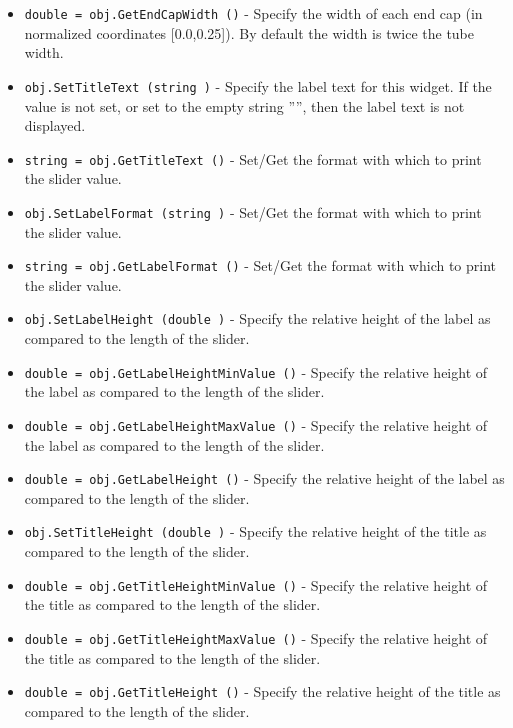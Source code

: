 \begin{itemize}
\item  \verb|double = obj.GetEndCapWidth ()| -  Specify the width of each end cap (in normalized coordinates
 [0.0,0.25]). By default the width is twice the tube width. 

\item  \verb|obj.SetTitleText (string )| -  Specify the label text for this widget. If the value is not set, or set
 to the empty string '''', then the label text is not displayed.

\item  \verb|string = obj.GetTitleText ()| -  Set/Get the format with which to print the slider value.

\item  \verb|obj.SetLabelFormat (string )| -  Set/Get the format with which to print the slider value.

\item  \verb|string = obj.GetLabelFormat ()| -  Set/Get the format with which to print the slider value.

\item  \verb|obj.SetLabelHeight (double )| -  Specify the relative height of the label as compared to the length of the
 slider. 

\item  \verb|double = obj.GetLabelHeightMinValue ()| -  Specify the relative height of the label as compared to the length of the
 slider. 

\item  \verb|double = obj.GetLabelHeightMaxValue ()| -  Specify the relative height of the label as compared to the length of the
 slider. 

\item  \verb|double = obj.GetLabelHeight ()| -  Specify the relative height of the label as compared to the length of the
 slider. 

\item  \verb|obj.SetTitleHeight (double )| -  Specify the relative height of the title as compared to the length of the
 slider. 

\item  \verb|double = obj.GetTitleHeightMinValue ()| -  Specify the relative height of the title as compared to the length of the
 slider. 

\item  \verb|double = obj.GetTitleHeightMaxValue ()| -  Specify the relative height of the title as compared to the length of the
 slider. 

\item  \verb|double = obj.GetTitleHeight ()| -  Specify the relative height of the title as compared to the length of the
 slider. 


\end{itemize}
